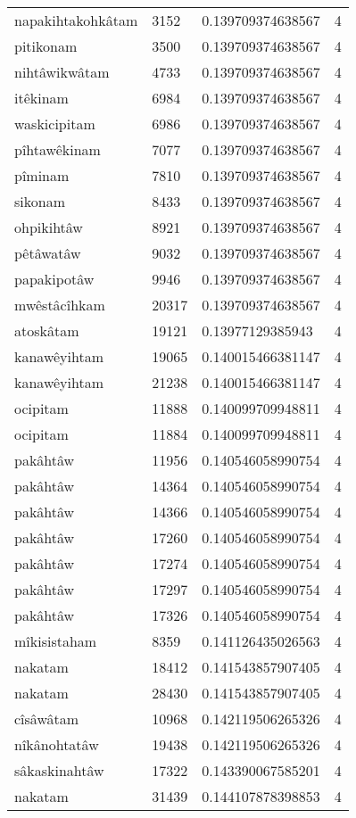 \begin{longtable}{llll}
napakihtakohkâtam & 3152 & 0.139709374638567 & 4 \\
pitikonam & 3500 & 0.139709374638567 & 4 \\
nihtâwikwâtam & 4733 & 0.139709374638567 & 4 \\
itêkinam & 6984 & 0.139709374638567 & 4 \\
waskicipitam & 6986 & 0.139709374638567 & 4 \\
pîhtawêkinam & 7077 & 0.139709374638567 & 4 \\
pîminam & 7810 & 0.139709374638567 & 4 \\
sikonam & 8433 & 0.139709374638567 & 4 \\
ohpikihtâw & 8921 & 0.139709374638567 & 4 \\
pêtâwatâw & 9032 & 0.139709374638567 & 4 \\
papakipotâw & 9946 & 0.139709374638567 & 4 \\
mwêstâcîhkam & 20317 & 0.139709374638567 & 4 \\
atoskâtam & 19121 & 0.13977129385943 & 4 \\
kanawêyihtam & 19065 & 0.140015466381147 & 4 \\
kanawêyihtam & 21238 & 0.140015466381147 & 4 \\
ocipitam & 11888 & 0.140099709948811 & 4 \\
ocipitam & 11884 & 0.140099709948811 & 4 \\
pakâhtâw & 11956 & 0.140546058990754 & 4 \\
pakâhtâw & 14364 & 0.140546058990754 & 4 \\
pakâhtâw & 14366 & 0.140546058990754 & 4 \\
pakâhtâw & 17260 & 0.140546058990754 & 4 \\
pakâhtâw & 17274 & 0.140546058990754 & 4 \\
pakâhtâw & 17297 & 0.140546058990754 & 4 \\
pakâhtâw & 17326 & 0.140546058990754 & 4 \\
mîkisistaham & 8359 & 0.141126435026563 & 4 \\
nakatam & 18412 & 0.141543857907405 & 4 \\
nakatam & 28430 & 0.141543857907405 & 4 \\
cîsâwâtam & 10968 & 0.142119506265326 & 4 \\
nîkânohtatâw & 19438 & 0.142119506265326 & 4 \\
sâkaskinahtâw & 17322 & 0.143390067585201 & 4 \\
nakatam & 31439 & 0.144107878398853 & 4 \\

\end{longtable}
